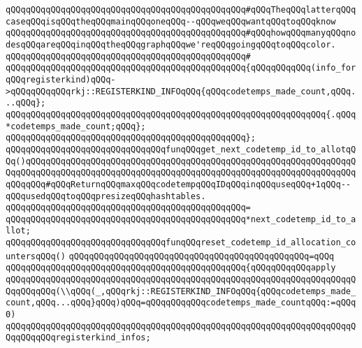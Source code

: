 \verb|qQQqqQQqqQQqqQQqqQQqqQQqqQQqqQQqqQQqqQQqqQQqqQQq#qQQqTheqQQqlatterqQQqcaseqQQqisqQQqtheqQQqmainqQQqoneqQQq--qQQqweqQQqwantqQQqtoqQQqknow|\newline
\verb|qQQqqQQqqQQqqQQqqQQqqQQqqQQqqQQqqQQqqQQqqQQqqQQq#qQQqhowqQQqmanyqQQqnodesqQQqareqQQqinqQQqtheqQQqgraphqQQqwe'reqQQqgoingqQQqtoqQQqcolor.|\newline
\verb|qQQqqQQqqQQqqQQqqQQqqQQqqQQqqQQqqQQqqQQqqQQqqQQq#|\newline
\verb|qQQqqQQqqQQqqQQqqQQqqQQqqQQqqQQqqQQqqQQqqQQqqQQq{qQQqqQQqqQQq(info_forqQQqregisterkind)qQQq->qQQqqQQqqQQqrkj::REGISTERKIND_INFOqQQq{qQQqcodetemps_made_count,qQQq...qQQq};|\newline
\newline
\verb|qQQqqQQqqQQqqQQqqQQqqQQqqQQqqQQqqQQqqQQqqQQqqQQqqQQqqQQqqQQqqQQq{.qQQq*codetemps_made_count;qQQq};|\newline
\verb|qQQqqQQqqQQqqQQqqQQqqQQqqQQqqQQqqQQqqQQqqQQqqQQq};|\newline
\newline
\verb|qQQqqQQqqQQqqQQqqQQqqQQqqQQqqQQqfunqQQqget_next_codetemp_id_to_allotqQQq()qQQqqQQqqQQqqQQqqQQqqQQqqQQqqQQqqQQqqQQqqQQqqQQqqQQqqQQqqQQqqQQqqQQqqQQqqQQqqQQqqQQqqQQqqQQqqQQqqQQqqQQqqQQqqQQqqQQqqQQqqQQqqQQqqQQqqQQqqQQqqQQq#qQQqReturnqQQqmaxqQQqcodetempqQQqIDqQQqinqQQquseqQQq+1qQQq--qQQqusedqQQqtoqQQqpresizeqQQqhashtables.|\newline
\verb|qQQqqQQqqQQqqQQqqQQqqQQqqQQqqQQqqQQqqQQqqQQqqQQq=|\newline
\verb|qQQqqQQqqQQqqQQqqQQqqQQqqQQqqQQqqQQqqQQqqQQqqQQq*next_codetemp_id_to_allot;|\newline
\newline
\verb|qQQqqQQqqQQqqQQqqQQqqQQqqQQqqQQqfunqQQqreset_codetemp_id_allocation_countersqQQq()|\newline
\verb|qQQqqQQqqQQqqQQqqQQqqQQqqQQqqQQqqQQqqQQqqQQqqQQq=qQQq|\newline
\verb|qQQqqQQqqQQqqQQqqQQqqQQqqQQqqQQqqQQqqQQqqQQqqQQq{qQQqqQQqqQQqapply|\newline
\verb|qQQqqQQqqQQqqQQqqQQqqQQqqQQqqQQqqQQqqQQqqQQqqQQqqQQqqQQqqQQqqQQqqQQqqQQqqQQqqQQq(\\qQQq(_,qQQqrkj::REGISTERKIND_INFOqQQq{qQQqcodetemps_made_count,qQQq...qQQq}qQQq)qQQq=qQQqqQQqqQQqcodetemps_made_countqQQq:=qQQq0)|\newline
\verb|qQQqqQQqqQQqqQQqqQQqqQQqqQQqqQQqqQQqqQQqqQQqqQQqqQQqqQQqqQQqqQQqqQQqqQQqqQQqqQQqregisterkind_infos;|\newline
\newline
